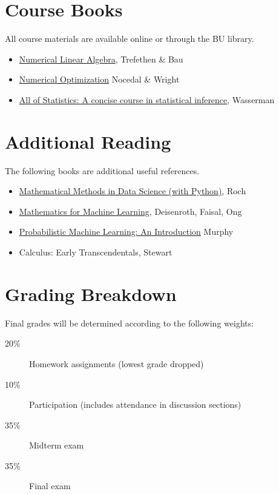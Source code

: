 \documentclass[11pt]{article}
\begin{document}
\section*{Course Books}
All course materials are available online or through the BU library.
\begin{itemize}
\item \href{https://www.stat.uchicago.edu/~lekheng/courses/309/books/Trefethen-Bau.pdf}{Numerical Linear Algebra}, Trefethen \& Bau 
\item \href{https://www.math.uci.edu/~qnie/Publications/NumericalOptimization.pdf}{Numerical Optimization} Nocedal \& Wright
\item  \href{library.bu.edu}{All of Statistics: A concise course in statistical inference}, Wasserman
\end{itemize}

\section*{Additional Reading}
The following books are additional useful references.
\begin{itemize}
\item \href{https://mmids-textbook.github.io/index.html}{Mathematical Methods in Data Science (with Python)}, Roch
\item \href{https://mml-book.github.io/book/mml-book.pdf}{Mathematics for Machine Learning}, Deisenroth, Faisal, Ong
\item \href{https://probml.github.io/pml-book/book1.html}{Probabilistic Machine Learning: An Introduction} Murphy
\item Calculus: Early Transcendentals, Stewart
\end{itemize}

\section*{Grading Breakdown}

Final grades will be determined according to the following weights:

\begin{description}
    \item[20\%] Homework assignments (lowest grade dropped)
    \item[10\%] Participation (includes attendance in discussion sections)
    \item[35\%] Midterm exam
    \item[35\%] Final exam
\end{description}
\end{document}
